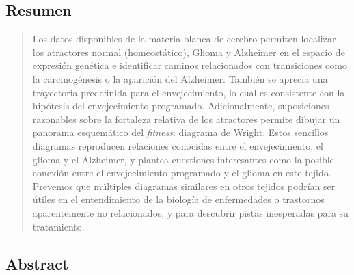 \vfill

\begin{center}
\section*{Resumen}
\end{center}
\medskip

\begin{minipage}[c]{.9\linewidth}
\begin{quote}
	
{\large Los datos disponibles de la materia blanca de cerebro permiten localizar los atractores normal (homeostático), Glioma y Alzheimer en el espacio de expresión genética e identificar caminos relacionados con transiciones como la carcinogénesis o la aparición del Alzheimer. También se aprecia una trayectoria predefinida para el envejecimiento, lo cual es consistente con la hipótesis del envejecimiento programado. Adicionalmente, suposiciones razonables sobre la fortaleza relativa de los atractores permite dibujar un panorama esquemático del \textit{fitness}: diagrama de Wright. Estos sencillos diagramas reproducen relaciones conocidas entre el envejecimiento, el glioma y el Alzheimer, y plantea cuestiones interesantes como la posible conexión entre el envejecimiento programado y el glioma en este tejido. Prevemos que múltiples diagramas similares en otros tejidos podrían ser útiles en el entendimiento de la biología de enfermedades o trastornos aparentemente no relacionados, y para descubrir pistas inesperadas para su tratamiento.}




\end{quote}
\end{minipage}

\smallskip
\vfill
\cleardoublepage


\begin{center}
\section*{Abstract}
\end{center}
\medskip

